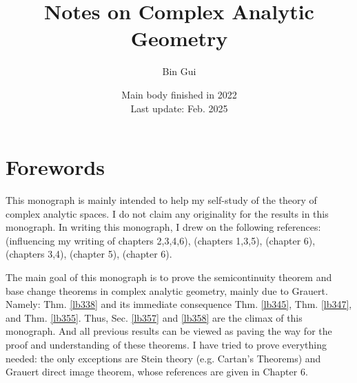 \documentclass[12pt,b5paper,notitlepage]{report}
\title{Notes on Complex Analytic Geometry}
\author{{\sc Bin Gui}
}
\date{\footnotesize Main body finished in 2022\\Last update: Feb. 2025}
\theoremstyle{definition}
\theoremstyle{plain}
\numberwithin{equation}{section}
\begin{document}
\sloppy %
	\setcounter{page}{1}
	\setcounter{section}{-1}
	






	
	\maketitle



\makeatletter
\newcommand*{\toccontents}{}
\makeatother
\toccontents



	


\newpage


\chapter*{Forewords}

This monograph is mainly intended to help my self-study of the theory of complex analytic spaces. I do not claim any originality for the results in this monograph. In writing this monograph, I drew on the following references: \cite{GR-b} (influencing my writing of chapters 2,3,4,6), \cite{Fis} (chapters 1,3,5), \cite{BS} (chapter 6), \cite{GPR} (chapters 3,4), \cite{Vak17} (chapter 5), \cite{Dem} (chapter 6).

The main goal of this monograph is to prove the semicontinuity theorem and base change theorems in complex analytic geometry, mainly due to Grauert. Namely: Thm. \ref{lb338} and its immediate consequence Thm. \ref{lb345}, Thm. \ref{lb347}, and Thm. \ref{lb355}. Thus, Sec. \ref{lb357} and \ref{lb358} are the climax of this monograph. And all previous results can be viewed as paving the way for the proof and  understanding of these theorems. I have tried to prove everything needed: the only exceptions are Stein theory (e.g. Cartan's Theorems) and Grauert direct image theorem, whose references are given in Chapter 6. 
\end{document}
